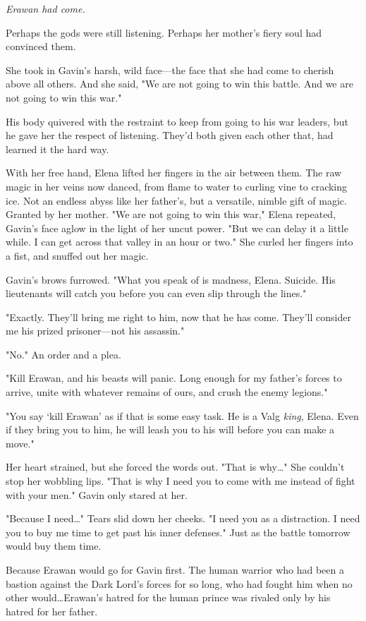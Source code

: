 \emph{Erawan had come.}

Perhaps the gods were still listening.
Perhaps her mother's fiery soul had convinced them.

She took in Gavin's harsh, wild face---the face that she had come to cherish above all others.
And she said, "We are not going to win this battle.
And we are not going to win this war."

His body quivered with the restraint to keep from going to his war leaders, but he gave her the respect of listening.
They'd both given each other that, had learned it the hard way.

With her free hand, Elena lifted her fingers in the air between them.
The raw magic in her veins now danced, from flame to water to curling vine to cracking ice.
Not an endless abyss like her father's, but a versatile, nimble gift of magic.
Granted by her mother.
"We are not going to win this war," Elena repeated, Gavin's face aglow in the light of her uncut power.
"But we can delay it a little while.
I can get across that valley in an hour or two."
She curled her fingers into a fist, and snuffed out her magic.

Gavin's brows furrowed.
"What you speak of is madness, Elena.
Suicide.
His lieutenants will catch you before you can even slip through the lines."

"Exactly.
They'll bring me right to him, now that he has come.
They'll consider me his prized prisoner---not his assassin."


"No."
An order and a plea.

"Kill Erawan, and his beasts will panic.
Long enough for my father's forces to arrive, unite with whatever remains of ours, and crush the enemy legions."

"You say `kill Erawan' as if that is some easy task.
He is a Valg \emph{king}, Elena.
Even if they bring you to him, he will leash you to his will before you can make a move."

Her heart strained, but she forced the words out.
"That is why\ldots" She couldn't stop her wobbling lips.
"That is why I need you to come with me instead of fight with your men."
Gavin only stared at her.

"Because I need\ldots" Tears slid down her cheeks.
"I need you as a distraction.
I need you to buy me time to get past his inner defenses."
Just as the battle tomorrow would buy them time.

Because Erawan would go for Gavin first.
The human warrior who had been a bastion against the Dark Lord's forces for so long, who had fought him when no other would\ldots Erawan's hatred for the human prince was rivaled only by his hatred for her father.

